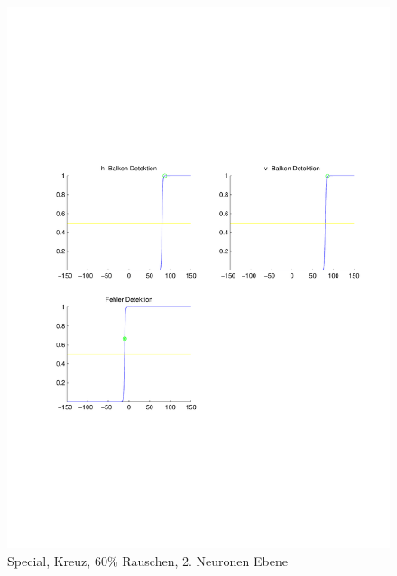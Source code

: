\begin{figure}[hbt]
\begin{minipage}{0.8 \textwidth}
		\includegraphics[width=\textwidth]{./Bilder/Auswertung/Endergebnis/TypeSpecial_Rauschen60_Cross_Layer2}
		\caption{Special, Kreuz, 60\% Rauschen, 2. Neuronen Ebene}
		\label{Special_Kreuz_60_2}
	\end{minipage}
\end{figure}

